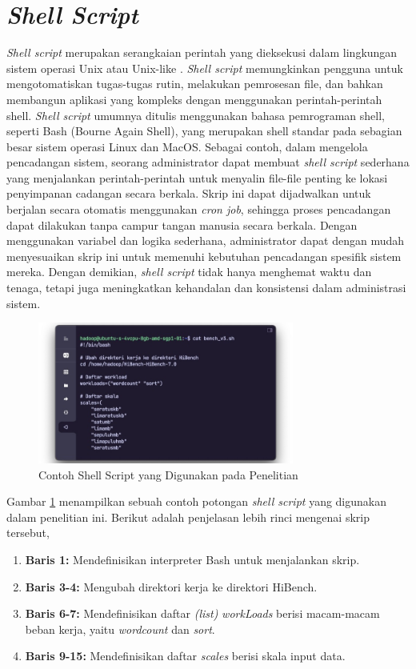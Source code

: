 \section{\textit{Shell Script}}
\textit{Shell script} merupakan serangkaian perintah yang dieksekusi dalam lingkungan sistem operasi Unix atau Unix-like \cite{newhamLearningBashShell2005}. \textit{Shell script} memungkinkan pengguna untuk mengotomatiskan tugas-tugas rutin, melakukan pemrosesan file, dan bahkan membangun aplikasi yang kompleks dengan menggunakan perintah-perintah shell. \textit{Shell script} umumnya ditulis menggunakan bahasa pemrograman shell, seperti Bash (Bourne Again Shell), yang merupakan shell standar pada sebagian besar sistem operasi Linux dan MacOS.
Sebagai contoh, dalam mengelola pencadangan sistem, seorang administrator dapat membuat \textit{shell script} sederhana yang menjalankan perintah-perintah untuk menyalin file-file penting ke lokasi penyimpanan cadangan secara berkala. Skrip ini dapat dijadwalkan untuk berjalan secara otomatis menggunakan \textit{cron job}, sehingga proses pencadangan dapat dilakukan tanpa campur tangan manusia secara berkala. Dengan menggunakan variabel dan logika sederhana, administrator dapat dengan mudah menyesuaikan skrip ini untuk memenuhi kebutuhan pencadangan spesifik sistem mereka. Dengan demikian, \textit{shell script} tidak hanya menghemat waktu dan tenaga, tetapi juga meningkatkan kehandalan dan konsistensi dalam administrasi sistem.

\begin{figure}[h]
    \centering
    \includegraphics[width=0.75\textwidth]{figures/ch02/contoh-bash}
    \caption{Contoh Shell Script yang Digunakan pada Penelitian}
    \label{fig:contoh-bash}
\end{figure}

Gambar \ref{fig:contoh-bash} menampilkan sebuah contoh potongan \textit{shell script} yang digunakan dalam penelitian ini. Berikut adalah penjelasan lebih rinci mengenai skrip tersebut,
\begin{enumerate}
    \item \textbf{Baris 1:} Mendefinisikan interpreter Bash untuk menjalankan skrip.
    \item \textbf{Baris 3-4: } Mengubah direktori kerja ke direktori HiBench.
    \item \textbf{Baris 6-7: } Mendefinisikan daftar \textit{(list)} \textit{workLoads} berisi macam-macam beban kerja, yaitu \textit{wordcount} dan \textit{sort}.
    \item \textbf{Baris 9-15: } Mendefinisikan daftar \textit{scales} berisi skala input data.
\end{enumerate}

